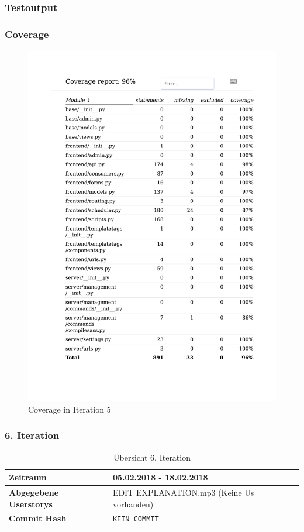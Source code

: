 \subsubsection{Testoutput }

\subsubsection{Coverage}
\begin{figure}[H]
	\centering
\includegraphics[width=.9\textwidth]{test_output/05_iteration_coverage.pdf}
	\caption{Coverage in Iteration 5}
\end{figure}

\subsubsection{6. Iteration}
\begin{table}[H]
\begin{center}
	\begin{tabular}{| l | l |}
		\hline
		\textbf{Zeitraum} &  05.02.2018 - 18.02.2018\\\hline
		\textbf{Abgegebene Userstorys} & EDIT EXPLANATION.mp3 (Keine Us vorhanden)\\\hline
		\textbf{Commit Hash} & \texttt{KEIN COMMIT} \\\hline
	\end{tabular}
	\caption{Übersicht 6. Iteration}
\end{center}
\end{table}

